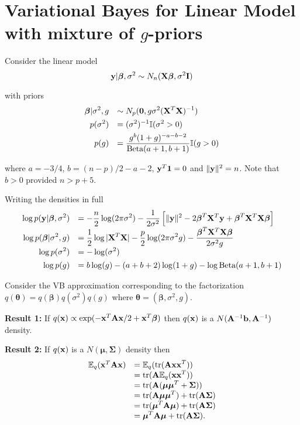 \documentclass{article}
\def\vectorfontone{\bf}
\def\vectorfonttwo{\boldsymbol}
\def\vb{{\vectorfontone b}}                      %
\def\vx{{\vectorfontone x}}                      %
\def\vy{{\vectorfontone y}}                      %
\def\vone{{\vectorfontone 1}}
\def\vzero{{\vectorfontone 0}}
\def\vbeta{{\vectorfonttwo \beta}}               %
\def\vtheta{{\vectorfonttwo \theta}}             %
\def\vmu{{\vectorfonttwo \mu}}                   %
\def\matrixfontone{\bf}
\def\matrixfonttwo{\boldsymbol}
\def\mA{{\matrixfontone A}}                      %
\def\mI{{\matrixfontone I}}                      %
\def\mX{{\matrixfontone X}}                      %
\def\mSigma{{\matrixfonttwo \Sigma}}             %
\def\bE{{\mathbb E}}                             %
\def\bI{{\mathbb I}}                             %
\def\ds{\displaystyle}
\begin{document}
	

\section{Variational Bayes for Linear Model with mixture of $g$-priors}

Consider the linear model
$$
\ds \vy|\vbeta,\sigma^2 \sim N_n(\mX\vbeta,\sigma^2\mI) 
$$

\noindent with priors
\begin{equation}\label{eq:model}
\begin{array}{rl}
\ds \vbeta|\sigma^2,g 
& \ds \sim N_p(\vzero,g\sigma^2(\mX^T\mX)^{-1}) 
\\ [1ex]
\ds p(\sigma^2) 
& \ds = (\sigma^2)^{-1} \bI(\sigma^2>0) 
\\ [1ex]
\ds p(g) 
& \ds = \frac{g^{b}(1 + g)^{-a-b-2}}{\mbox{Beta}(a+1,b+1)}  \bI(g>0)
\end{array}
\end{equation}

\noindent where $a= - 3/4$, $b = (n - p)/2 - a - 2$, 
$\vy^T\vone = 0$
and $\|\vy\|^2 = n$. Note that $b > 0$ provided $n > p + 5$. 

\medskip 
\noindent Writing the densities in full
$$
\begin{array}{rl}
\ds \log p(\vy|\vbeta,\sigma^2)
& \ds = - \frac{n}{2}\log(2\pi\sigma^2) - \frac{1}{2\sigma^2}\left[
\|\vy\|^2  - 2\vbeta^T\mX^T\vy + \vbeta^T\mX^T\mX\vbeta \right] 
\\ [1ex]
\ds \log p(\vbeta|\sigma^2,g)
& \ds = \frac{1}{2}\log|\mX^T\mX| - \frac{p}{2}\log(2\pi\sigma^2 g) - \frac{\vbeta^T\mX^T\mX\vbeta}{2\sigma^2 g}
\\ [1ex]
\ds \log p(\sigma^2)
& \ds = -\log(\sigma^2)
\\ [1ex]
\log p(g) 
& \ds = b\log(g) - (a+b+2)\log(1 + g) - \log\mbox{Beta}(a+1,b+1)
\end{array}
$$

\medskip 
\noindent Consider the VB approximation corresponding to the factorization
$q(\vtheta) = q(\vbeta)q(\sigma^2)q(g)$
where $\vtheta = (\vbeta,\sigma^2,g)$.

\medskip 
\noindent
{\bf Result 1:} If $q(\vx) \propto \exp( -\vx^T\mA\vx/2 + \vx^T\vbeta)$ then $q(\vx)$ is a $N(\mA^{-1}\vb,\mA^{-1})$ density.

\medskip 
\noindent
{\bf Result 2:} If $q(\vx)$ 
is a $N(\vmu,\mSigma)$ density then
$$
\begin{array}{rl}
\bE_q(\vx^T\mA\vx) 
& \ds = \bE_q(\mbox{tr}(\mA\vx\vx^T))
\\
& \ds = \mbox{tr}(\mA\bE_q(\vx\vx^T))
\\
& \ds = \mbox{tr}(\mA(\vmu\vmu^T + \mSigma))
\\
& \ds = \mbox{tr}(\mA\vmu\vmu^T) + \mbox{tr}(\mA\mSigma)
\\
& \ds = \mbox{tr}(\vmu^T\mA\vmu) + \mbox{tr}(\mA\mSigma)
\\
& \ds = \vmu^T\mA\vmu + \mbox{tr}(\mA\mSigma).
\end{array}
$$
\end{document}
